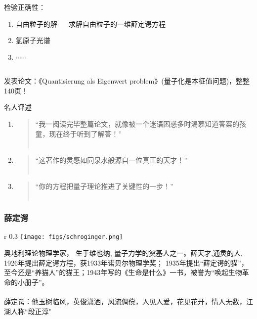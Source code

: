 \begin{frame}
    \frametitle{}
    检验正确性：
    \begin{enumerate}
         \item 自由粒子的解 ~~ 求解自由粒子的一维薛定谔方程
         \item 氢原子光谱
         \item $\cdots \cdots$
    \end{enumerate}
    ~\\ 
    发表论文：《Quantisierung als Eigenwert problem》(量子化是本征值问题)，整整140页！
\end{frame}

\begin{frame}{名人评述}
    \begin{enumerate}
         \item 
        \begin{quote}
            “我一阅读完毕整篇论文，就像被一个迷语困惑多时渴慕知道答案的孩童，现在终于听到了解答！” \\
            ~~\\
        \end{quote}  
         \item 
        \begin{quote}
            “这著作的灵感如同泉水般源自一位真正的天才！” \\
            ~~\\
        \end{quote}  
         \item  
        \begin{quote}
            “你的方程把量子理论推进了关键性的一步！” \\
            ~~\\
        \end{quote} 
    \end{enumerate}
\end{frame}

\begin{frame}
    \frametitle{薛定谔}
    \begin{wrapfigure} {r} {0.3\textwidth} %
        \texttt{[image: figs/schroginger.png]}   
    \end{wrapfigure}
奥地利理论物理学家， 生于维也纳, 量子力学的奠基人之一。薛天才,通灵的人, 1926年提出薛定谔方程，获1933年诺贝尔物理学奖； 1935年提出“薛定谔的猫”，至今还是“养猫人”的猫王；1943年写的《生命是什么》一书，被誉为“唤起生物革命的小册子”。\\ 
~~\\ 
薛定谔：他玉树临风，英俊潇洒，风流倜傥，人见人爱，花见花开，情人无数，江湖人称“段正淳"
\end{frame}


